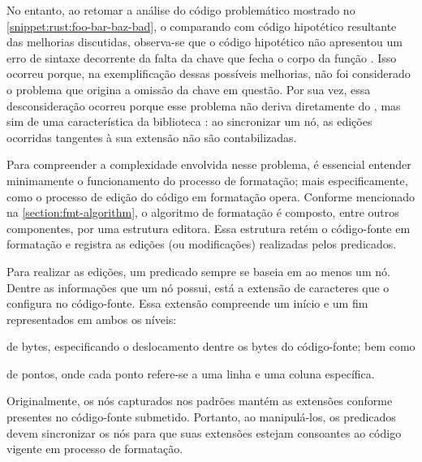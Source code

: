 \documentclass
  [11pt,a4paper,english,brazil,openright,sumario=tradicional,twoside]
  {abntex2}
\begin{document}
  No entanto, ao retomar a análise do código problemático mostrado no
  \cref{snippet:rust:foo-bar-baz-bad}, o comparando com código hipotético
  resultante das melhorias discutidas, observa-se que o código hipotético não
  apresentou um erro de sintaxe decorrente da falta da chave que fecha o corpo
  da função . Isso ocorreu porque, na exemplificação
  dessas possíveis melhorias, não foi considerado o problema que origina a
  omissão da chave em questão. Por sua vez, essa desconsideração ocorreu porque
  esse problema não deriva diretamente do \witchcooking, mas sim de uma
  característica da biblioteca \treesitter: ao sincronizar um nó, as edições
  ocorridas tangentes à sua extensão não são contabilizadas.

  Para compreender a complexidade envolvida nesse problema, é essencial
  entender minimamente o funcionamento do processo de formatação; mais
  especificamente, como o processo de edição do código em formatação opera.
  Conforme mencionado na \cref{section:fmt-algorithm}, o algoritmo de
  formatação é composto, entre outros componentes, por uma estrutura editora.
  Essa estrutura retém o código-fonte em formatação e registra as edições (ou
  modificações) realizadas pelos predicados.

  Para realizar as edições, um predicado sempre se baseia em ao menos um nó.
  Dentre as informações que um nó possui, está a extensão de caracteres que o
  configura no código-fonte. Essa extensão compreende um início e um fim
  representados em ambos os níveis:
  \begin{inparaenum}
    \item de bytes, especificando o deslocamento dentre os bytes do
          código-fonte; bem como
    \item de pontos, onde cada ponto refere-se a uma linha e uma coluna
          específica.
  \end{inparaenum}
  Originalmente, os nós capturados nos padrões mantém as extensões conforme
  presentes no código-fonte submetido. Portanto, ao manipulá-los, os
  predicados devem sincronizar os nós para que suas extensões estejam
  consoantes ao código vigente em processo de formatação.
\end{document}
